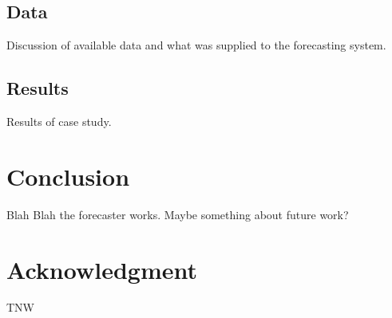 \documentclass[conference]{IEEEtran}
\begin{document}
\subsection{Data}
Discussion of available data and what was supplied to the forecasting system.

\subsection{Results}
Results of case study.

\section{Conclusion}
Blah Blah the forecaster works.
Maybe something about future work?


\section*{Acknowledgment}
TNW




\end{document}
